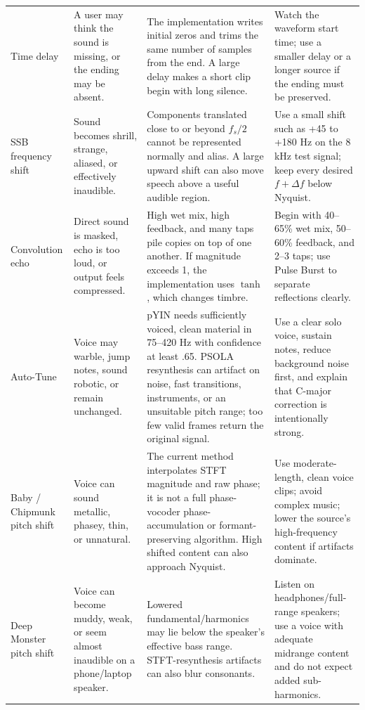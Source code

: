 \documentclass[11pt,a4paper]{article}
\begin{document}
{\begin{longtable}{@{}p{.19\linewidth}p{.23\linewidth}p{.32\linewidth}p{.18\linewidth}@{}}
Time delay & A user may think the sound is missing, or the ending may be absent. & The implementation writes initial zeros and trims the same number of samples from the end. A large delay makes a short clip begin with long silence. & Watch the waveform start time; use a smaller delay or a longer source if the ending must be preserved.\\

SSB frequency shift & Sound becomes shrill, strange, aliased, or effectively inaudible. & Components translated close to or beyond \(f_s/2\) cannot be represented normally and alias. A large upward shift can also move speech above a useful audible region. & Use a small shift such as +45 to +180 Hz on the 8 kHz test signal; keep every desired \(f+\Delta f\) below Nyquist.\\

Convolution echo & Direct sound is masked, echo is too loud, or output feels compressed. & High wet mix, high feedback, and many taps pile copies on top of one another. If magnitude exceeds 1, the implementation uses \(\tanh\), which changes timbre. & Begin with 40--65\% wet mix, 50--60\% feedback, and 2--3 taps; use Pulse Burst to separate reflections clearly.\\

Auto-Tune & Voice may warble, jump notes, sound robotic, or remain unchanged. & pYIN needs sufficiently voiced, clean material in 75--420 Hz with confidence at least .65. PSOLA resynthesis can artifact on noise, fast transitions, instruments, or an unsuitable pitch range; too few valid frames return the original signal. & Use a clear solo voice, sustain notes, reduce background noise first, and explain that C-major correction is intentionally strong.\\

Baby / Chipmunk pitch shift & Voice can sound metallic, phasey, thin, or unnatural. & The current method interpolates STFT magnitude and raw phase; it is not a full phase-vocoder phase-accumulation or formant-preserving algorithm. High shifted content can also approach Nyquist. & Use moderate-length, clean voice clips; avoid complex music; lower the source's high-frequency content if artifacts dominate.\\

Deep Monster pitch shift & Voice can become muddy, weak, or seem almost inaudible on a phone/laptop speaker. & Lowered fundamental/harmonics may lie below the speaker's effective bass range. STFT-resynthesis artifacts can also blur consonants. & Listen on headphones/full-range speakers; use a voice with adequate midrange content and do not expect added sub-harmonics.\\


\end{longtable}}
\end{document}
